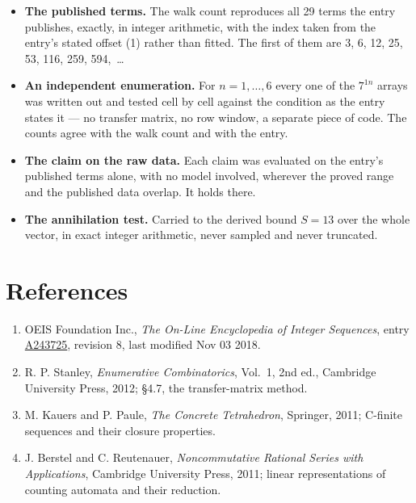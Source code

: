 \documentclass[11pt]{article}
\theoremstyle{definition}
\begin{document}
\begin{itemize}

\item {\bfseries The published terms.} The walk count reproduces all 29 terms the entry publishes, exactly, in integer arithmetic, with the index taken from the entry's stated offset (1) rather than fitted. The first of them are 3, 6, 12, 25, 53, 116, 259, 594,~\dots

\item {\bfseries An independent enumeration.} For $n = 1,\dots,6$ every one of the $7^{1n}$ arrays was written out and tested cell by cell against the condition as the entry states it --- no transfer matrix, no row window, a separate piece of code. The counts agree with the walk count and with the entry.

\item {\bfseries The claim on the raw data.} Each claim was evaluated on the entry's published terms alone, with no model involved, wherever the proved range and the published data overlap. It holds there.

\item {\bfseries The annihilation test.} Carried to the derived bound $S = 13$ over the whole vector, in exact integer arithmetic, never sampled and never truncated.

\end{itemize}

\section{References}

\begin{enumerate}

\item OEIS Foundation Inc., \emph{The On-Line Encyclopedia of Integer Sequences}, entry \href{https://oeis.org/A243725}{A243725}, revision 8, last modified Nov 03 2018.

\item R. P. Stanley, \emph{Enumerative Combinatorics}, Vol.~1, 2nd ed., Cambridge University Press, 2012; \S4.7, the transfer-matrix method.

\item M. Kauers and P. Paule, \emph{The Concrete Tetrahedron}, Springer, 2011; C-finite sequences and their closure properties.

\item J. Berstel and C. Reutenauer, \emph{Noncommutative Rational Series with Applications}, Cambridge University Press, 2011; linear representations of counting automata and their reduction.

\end{enumerate}
\end{document}
